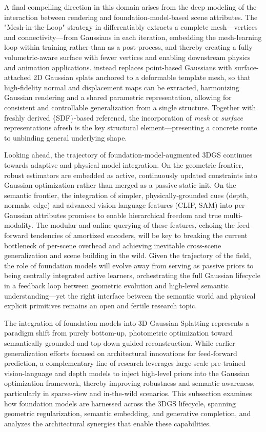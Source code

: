 \documentclass[11pt,a4paper]{article}
\begin{document}
A final compelling direction in this domain arises from the deep modeling of the interaction between rendering and foundation-model-based scene attributes. The "Mesh-in-the-Loop" strategy in \cite{arxiv:2506.24096v2} differentiably extracts a complete mesh---vertices and connectivity---from Gaussians in each iteration, embedding the mesh-learning loop within training rather than as a post-process, and thereby creating a fully volumetric-aware surface with fewer vertices and enabling downstream physics and animation applications. \cite{arxiv:2604.24918v1,arxiv:2512.10572v1} instead replaces point-based Gaussians with surface-attached 2D Gaussian splats anchored to a deformable template mesh, so that high-fidelity normal and displacement maps can be extracted, harmonizing Gaussian rendering and a shared parametric representation, allowing for consistent and controllable generalization from a single structure. Together with freshly derived \{SDF\}-based referencd, the incorporation of \emph{mesh} or \emph{surface} representations afresh is the key structural element---presenting a concrete route to unbinding general underlying shape.

Looking ahead, the trajectory of foundation-model-augmented 3DGS continues towards adaptive and physical model integration. On the geometric frontier, robust estimators are embedded as active, continuously updated constraints into Gaussian optimization rather than merged as a passive static init. On the semantic frontier, the integration of simpler, physically-grounded cues (depth, normals, edge) and advanced vision-language features (CLIP, SAM) into per-Gaussian attributes promises to enable hierarchical freedom and true multi-modality. The modular and online querying of these features, echoing the feed-forward tendencies of amortized encoders, will be key to breaking the current bottleneck of per-scene overhead and achieving inevitable cross-scene generalization and scene building in the wild. Given the trajectory of the field, the role of foundation models will evolve away from serving as passive priors to being centrally integrated active learners, orchestrating the full Gaussian lifecycle in a feedback loop between geometric evolution and high-level semantic understanding---yet the right interface between the semantic world and physical explicit primitives remains an open and fertile research topic.

\cite{arxiv:2306.06812v1}
The integration of foundation models into 3D Gaussian Splatting represents a paradigm shift from purely bottom-up, photometric optimization toward semantically grounded and top-down guided reconstruction. While earlier generalization efforts focused on architectural innovations for feed-forward prediction, a complementary line of research leverages large-scale pre-trained vision-language and depth models to inject high-level priors into the Gaussian optimization framework, thereby improving robustness and semantic awareness, particularly in sparse-view and in-the-wild scenarios. This subsection examines how foundation models are harnessed across the 3DGS lifecycle, spanning geometric regularization, semantic embedding, and generative completion, and analyzes the architectural synergies that enable these capabilities.
\end{document}
